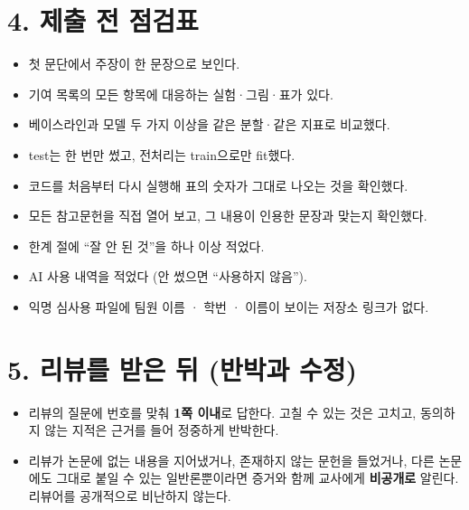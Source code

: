 \documentclass[11pt]{article}
\begin{document}
\section*{4. 제출 전 점검표}
\begin{itemize}
\item[$\square$] 첫 문단에서 주장이 한 문장으로 보인다.
\item[$\square$] 기여 목록의 모든 항목에 대응하는 실험·그림·표가 있다.
\item[$\square$] 베이스라인과 모델 두 가지 이상을 같은 분할·같은 지표로 비교했다.
\item[$\square$] test는 한 번만 썼고, 전처리는 train으로만 fit했다.
\item[$\square$] 코드를 처음부터 다시 실행해 표의 숫자가 그대로 나오는 것을 확인했다.
\item[$\square$] 모든 참고문헌을 직접 열어 보고, 그 내용이 인용한 문장과 맞는지 확인했다.
\item[$\square$] 한계 절에 ``잘 안 된 것''을 하나 이상 적었다.
\item[$\square$] AI 사용 내역을 적었다 (안 썼으면 ``사용하지 않음'').
\item[$\square$] 익명 심사용 파일에 팀원 이름 · 학번 · 이름이 보이는 저장소 링크가 없다.
\end{itemize}

\section*{5. 리뷰를 받은 뒤 (반박과 수정)}
\begin{itemize}
\item 리뷰의 질문에 번호를 맞춰 \textbf{1쪽 이내}로 답한다. 고칠 수 있는 것은 고치고, 동의하지 않는 지적은 근거를 들어 정중하게 반박한다.
\item 리뷰가 논문에 없는 내용을 지어냈거나, 존재하지 않는 문헌을 들었거나, 다른 논문에도 그대로 붙일 수 있는 일반론뿐이라면 증거와 함께 교사에게 \textbf{비공개로} 알린다. 리뷰어를 공개적으로 비난하지 않는다.
\end{itemize}

\vspace{6pt}
\end{document}
